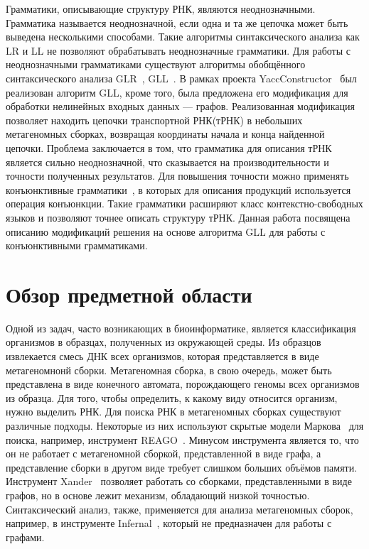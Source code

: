 \documentclass[14pt]{matmex-diploma-custom}
\begin{document}
Грамматики, описывающие структуру РНК, являются неоднозначными. Грамматика называется неоднозначной, если одна и та же цепочка может быть выведена несколькими способами. Такие алгоритмы синтаксического анализа как LR и LL не позволяют обрабатывать неоднозначные грамматики. Для работы с неоднозначными грамматиками существуют алгоритмы обобщённого синтаксического анализа GLR~\cite{GLR}, GLL~\cite{GLL}. В рамках проекта YaccConstructor~\cite{YaccConstructorPage, YaccConstructorPaper} был реализован алгоритм GLL, кроме того, была предложена его модификация для обработки нелинейных входных данных --- графов. Реализованная модификация позволяет находить цепочки транспортной РНК(тРНК) в небольших метагеномных сборках, возвращая координаты начала и конца найденной цепочки. Проблема заключается в том, что грамматика для описания тРНК является сильно неоднозначной, что сказывается на производительности и точности полученных результатов. Для повышения точности можно применять конъюнктивные грамматики~\cite{ConjGrammars}, в которых для описания продукций используется операция конъюнкции. Такие грамматики расширяют класс контекстно-свободных языков и позволяют точнее описать структуру тРНК. Данная работа посвящена описанию модификаций решения на основе алгоритма GLL для работы с конъюнктивными грамматиками.

\section{Обзор предметной области}
Одной из задач, часто возникающих в биоинформатике, является классификация организмов в образцах, полученных из окружающей среды. Из образцов извлекается смесь ДНК всех организмов, которая представляется в виде метагеномнонй сборки. Метагеномная сборка, в свою очередь, может быть представлена в виде конечного автомата, порождающего геномы всех организмов из образца. Для того, чтобы определить, к какому виду относится организм, нужно выделить РНК. Для поиска РНК в метагеномных сборках существуют различные подходы. Некоторые из них используют скрытые модели Маркова~\cite{markov} для поиска, например, инструмент REAGO~\cite{REAGO}. Минусом инструмента является то, что он не работает с метагеномной сборкой, представленной в виде графа, а представление сборки в другом виде требует слишком больших объёмов памяти. Инструмент Xander~\cite{Xander} позволяет работать со сборками, представленными в виде графов, но в основе лежит механизм, обладающий низкой точностью. Синтаксический анализ, также, применяется для анализа метагеномных сборок, например, в инструменте Infernal~\cite{Infernal}, который не предназначен для работы с графами.
\end{document}
